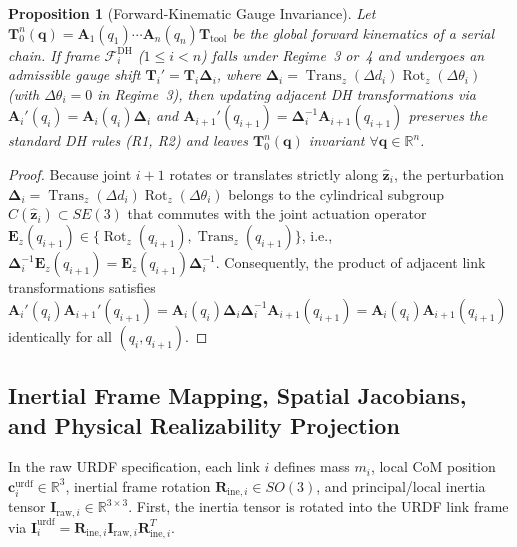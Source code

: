 \documentclass[fleqn,10pt]{article}
\newtheorem{proposition}{Proposition}
\begin{document}
	\begin{proposition}[Forward-Kinematic Gauge Invariance]
		\label{prop:gauge_invariance}
		Let $\bm{T}_0^n(\bm{q}) = \bm{A}_1(q_1)\cdots\bm{A}_n(q_n)\bm{T}_{\text{tool}}$ be the global forward kinematics of a serial chain. If frame $\mathcal{F}_i^{\text{DH}}$ ($1 \le i < n$) falls under Regime~3 or~4 and undergoes an admissible gauge shift $\bm{T}_i' = \bm{T}_i \bm{\Delta}_i$, where $\bm{\Delta}_i = \operatorname{Trans}_z(\Delta d_i)\operatorname{Rot}_z(\Delta \theta_i)$ (with $\Delta \theta_i = 0$ in Regime~3), then updating adjacent DH transformations via $\bm{A}_i'(q_i) = \bm{A}_i(q_i)\bm{\Delta}_i$ and $\bm{A}_{i+1}'(q_{i+1}) = \bm{\Delta}_i^{-1}\bm{A}_{i+1}(q_{i+1})$ preserves the standard DH rules (R1, R2) and leaves $\bm{T}_0^n(\bm{q})$ invariant $\forall \bm{q} \in \mathbb{R}^n$.
	\end{proposition}
	\begin{proof}
		Because joint $i+1$ rotates or translates strictly along $\hat{\bm{z}}_i$, the perturbation $\bm{\Delta}_i = \operatorname{Trans}_z(\Delta d_i)\operatorname{Rot}_z(\Delta \theta_i)$ belongs to the cylindrical subgroup $C(\hat{\bm{z}}_i) \subset SE(3)$ that commutes with the joint actuation operator $\bm{E}_{z}(q_{i+1}) \in \{\operatorname{Rot}_z(q_{i+1}), \operatorname{Trans}_z(q_{i+1})\}$, i.e., $\bm{\Delta}_i^{-1} \bm{E}_z(q_{i+1}) = \bm{E}_z(q_{i+1})\bm{\Delta}_i^{-1}$. Consequently, the product of adjacent link transformations satisfies $\bm{A}_i'(q_i)\bm{A}_{i+1}'(q_{i+1}) = \bm{A}_i(q_i)\bm{\Delta}_i \bm{\Delta}_i^{-1}\bm{A}_{i+1}(q_{i+1}) = \bm{A}_i(q_i)\bm{A}_{i+1}(q_{i+1})$ identically for all $(q_i, q_{i+1})$.
	\end{proof}
	
	\subsection*{Inertial Frame Mapping, Spatial Jacobians, and Physical Realizability Projection}
	
	In the raw URDF specification, each link $i$ defines mass $m_i$, local CoM position $\bm{c}_i^{\text{urdf}} \in \mathbb{R}^3$, inertial frame rotation $\bm{R}_{\text{ine},i} \in SO(3)$, and principal/local inertia tensor $\bm{I}_{\text{raw},i} \in \mathbb{R}^{3 \times 3}$. First, the inertia tensor is rotated into the URDF link frame via $\bm{I}_i^{\text{urdf}} = \bm{R}_{\text{ine},i} \bm{I}_{\text{raw},i} \bm{R}_{\text{ine},i}^T$.
	
\end{document}
